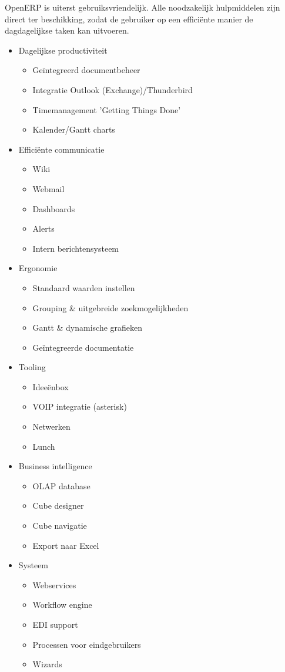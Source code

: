 OpenERP is uiterst gebruiksvriendelijk. Alle noodzakelijk hulpmiddelen zijn direct ter beschikking, zodat de gebruiker op een effici\"ente manier de dagdagelijkse taken kan uitvoeren.

\begin{itemize}
\item Dagelijkse productiviteit
\begin{itemize}
    \item Ge\"integreerd documentbeheer
    \item Integratie Outlook (Exchange)/Thunderbird
    \item Timemanagement 'Getting Things Done'
    \item Kalender/Gantt charts
\end{itemize}

\item Effici\"ente communicatie
\begin{itemize}
    \item Wiki
    \item Webmail
    \item Dashboards
    \item Alerts
    \item Intern berichtensysteem
\end{itemize}

\item Ergonomie
\begin{itemize}
    \item Standaard waarden instellen
    \item Grouping \& uitgebreide zoekmogelijkheden
    \item Gantt \& dynamische grafieken
    \item Ge\"integreerde documentatie
\end{itemize}

\item Tooling
\begin{itemize}
    \item Idee\"enbox
    \item VOIP integratie (asterisk)
    \item Netwerken
    \item Lunch
\end{itemize}

\item Business intelligence
\begin{itemize}
    \item OLAP database
    \item Cube designer
    \item Cube navigatie
    \item Export naar Excel
\end{itemize}

\item Systeem
\begin{itemize}
    \item Webservices
    \item Workflow engine
    \item EDI support
    \item Processen voor eindgebruikers
    \item Wizards
\end{itemize}

\end{itemize}
